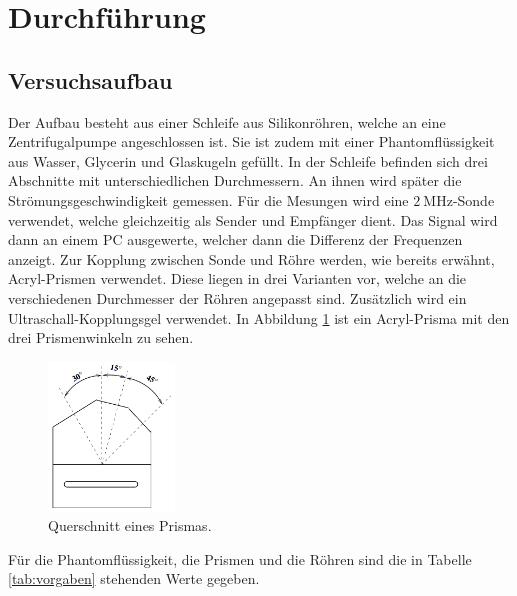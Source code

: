 \documentclass[
  bibliography=totoc,     %
  captions=tableheading,  %
  titlepage=firstiscover, %
]{scrartcl}
\begin{document}
\section{Durchführung}
\label{sec:durchführung}
\subsection{Versuchsaufbau}
\label{sec:aufbau}
Der Aufbau besteht aus einer Schleife aus Silikonröhren, welche an eine
Zentrifugalpumpe angeschlossen ist. Sie ist zudem mit einer Phantomflüssigkeit
aus Wasser, Glycerin und Glaskugeln gefüllt. In der Schleife befinden sich drei
Abschnitte mit unterschiedlichen Durchmessern. An ihnen wird später die
Strömungsgeschwindigkeit gemessen. Für die Mesungen wird eine $\SI{2}{\mega\hertz}$-Sonde
verwendet, welche gleichzeitig als Sender und Empfänger dient. Das Signal wird
dann an einem PC ausgewerte, welcher dann die Differenz der Frequenzen anzeigt.
Zur Kopplung zwischen Sonde und Röhre werden, wie bereits erwähnt, Acryl-Prismen
verwendet. Diese liegen in drei Varianten vor, welche an die verschiedenen Durchmesser
der Röhren angepasst sind. Zusätzlich wird ein Ultraschall-Kopplungsgel verwendet.
In Abbildung \ref{fig:prisma} ist ein Acryl-Prisma mit den drei Prismenwinkeln
zu sehen.
\begin{figure}[H]
  \centering
  \includegraphics[width=0.3\textwidth]{prisma.png}
  \caption{Querschnitt eines Prismas. \cite{anleitung}}
  \label{fig:prisma}
\end{figure}
\noindent
Für die Phantomflüssigkeit, die Prismen und die Röhren sind die in Tabelle \ref{tab:vorgaben}
stehenden Werte gegeben.
\end{document}
